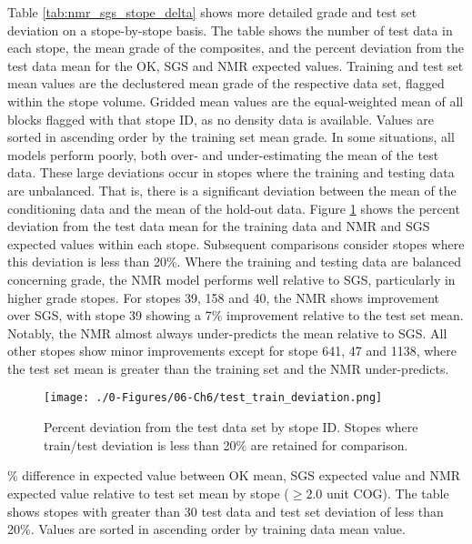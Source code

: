Table \ref{tab:nmr_sgs_stope_delta} shows more detailed grade and test set deviation on a stope-by-stope basis. The table shows the number of test data in each stope, the mean grade of the composites, and the percent deviation from the test data mean for the \gls{OK}, \gls{SGS} and \gls{NMR} expected values. Training and test set mean values are the declustered mean grade of the respective data set, flagged within the stope volume. Gridded mean values are the equal-weighted mean of all blocks flagged with that stope ID, as no density data is available. Values are sorted in ascending order by the training set mean grade. In some situations, all models perform poorly, both over- and under-estimating the mean of the test data. These large deviations occur in stopes where the training and testing data are unbalanced. That is, there is a significant deviation between the mean of the conditioning data and the mean of the hold-out data. Figure \ref{fig:test_train_deviation} shows the percent deviation from the test data mean for the training data and \gls{NMR} and \gls{SGS} expected values within each stope. Subsequent comparisons consider stopes where this deviation is less than 20\%. Where the training and testing data are balanced concerning grade, the \gls{NMR} model performs well relative to \gls{SGS}, particularly in higher grade stopes. For stopes 39, 158 and 40, the \gls{NMR} shows improvement over \gls{SGS}, with stope 39 showing a 7\% improvement relative to the test set mean. Notably, the \gls{NMR} almost always under-predicts the mean relative to \gls{SGS}. All other stopes show minor improvements except for stope 641, 47 and 1138, where the test set mean is greater than the training set and the \gls{NMR} under-predicts.


\begin{figure}[htb!]
    \centering
    \texttt{[image: ./0-Figures/06-Ch6/test\_train\_deviation.png]}
    \caption{Percent deviation from the test data set by stope ID. Stopes where train/test deviation is less than 20\% are retained for comparison. }
    \label{fig:test_train_deviation}
\end{figure}

\begin{table}[!htb]
    \centering
    \caption{\% difference in expected value between \gls{OK} mean, \gls{SGS} expected value and \gls{NMR} expected value relative to test set mean by stope ($\geq 2.0$ unit \gls{COG}). The table shows stopes with greater than 30 test data and test set deviation of less than 20\%. Values are sorted in ascending order by training data mean value.}
    \resizebox{0.9\width}{!}{}
    \label{tab:nmr_sgs_stope_delta}
\end{table}

